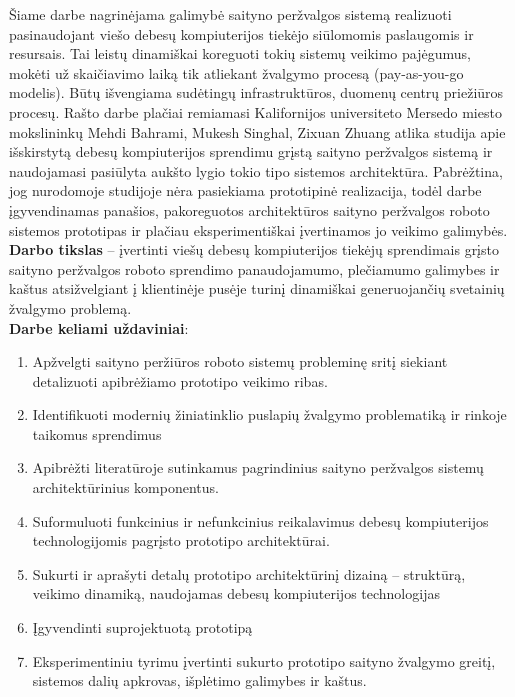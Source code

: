     Šiame darbe nagrinėjama galimybė saityno peržvalgos sistemą realizuoti pasinaudojant viešo debesų kompiuterijos tiekėjo siūlomomis paslaugomis ir resursais. Tai leistų dinamiškai koreguoti tokių sistemų veikimo pajėgumus, mokėti už skaičiavimo laiką tik atliekant žvalgymo procesą (pay-as-you-go modelis). Būtų išvengiama sudėtingų infrastruktūros, duomenų centrų priežiūros procesų. Rašto darbe plačiai remiamasi Kalifornijos universiteto Mersedo miesto mokslininkų Mehdi Bahrami, Mukesh Singhal, Zixuan Zhuang atlika studija \cite{MercedCloudBasedWebCrawler} apie išskirstytą debesų kompiuterijos sprendimu grįstą saityno peržvalgos sistemą ir naudojamasi pasiūlyta aukšto lygio tokio tipo sistemos architektūra. Pabrėžtina, jog nurodomoje studijoje nėra pasiekiama prototipinė realizacija, todėl darbe įgyvendinamas panašios, pakoreguotos architektūros saityno peržvalgos roboto sistemos prototipas ir plačiau eksperimentiškai įvertinamos jo veikimo galimybės.
\\

\textbf{Darbo tikslas} -- įvertinti viešų debesų kompiuterijos tiekėjų sprendimais grįsto saityno peržvalgos roboto sprendimo panaudojamumo, plečiamumo galimybes ir kaštus atsižvelgiant į klientinėje pusėje turinį dinamiškai generuojančių svetainių žvalgymo problemą.
\\

\textbf{Darbe keliami uždaviniai}:

\begin{enumerate}
    \item Apžvelgti saityno peržiūros roboto sistemų probleminę sritį siekiant detalizuoti apibrėžiamo prototipo veikimo ribas.
    \item Identifikuoti modernių žiniatinklio puslapių žvalgymo problematiką ir rinkoje taikomus sprendimus
    \item Apibrėžti literatūroje sutinkamus pagrindinius saityno peržvalgos sistemų architektūrinius komponentus.
    \item Suformuluoti funkcinius ir nefunkcinius reikalavimus debesų kompiuterijos technologijomis pagrįsto prototipo architektūrai.
    \item Sukurti ir aprašyti detalų prototipo architektūrinį dizainą -- struktūrą, veikimo dinamiką, naudojamas debesų kompiuterijos technologijas
    \item Įgyvendinti suprojektuotą prototipą
    \item Eksperimentiniu tyrimu įvertinti sukurto prototipo saityno žvalgymo greitį, sistemos dalių apkrovas, išplėtimo galimybes ir kaštus.
\end{enumerate}